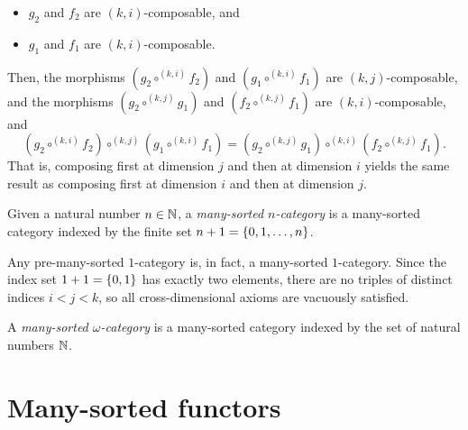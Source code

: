\begin{definition}
\begin{enumerate}
\begin{itemize}
        \item $g_2$ and $f_2$ are $(k,i)$-composable, and
        \item $g_1$ and $f_1$ are $(k,i)$-composable.
      \end{itemize}
      Then, the morphisms $(g_2 \circ^{(k,i)} f_2)$ and $(g_1 \circ^{(k,i)} f_1)$ are
      $(k,j)$-composable, and the morphisms $(g_2 \circ^{(k,j)} g_1)$ and $(f_2 \circ^{(k,j)} f_1)$
      are $(k,i)$-composable, and
      \[
        (g_2 \circ^{(k,i)} f_2) \circ^{(k,j)} (g_1 \circ^{(k,i)} f_1) =
        (g_2 \circ^{(k,j)} g_1) \circ^{(k,i)} (f_2 \circ^{(k,j)} f_1).
      \]
      That is, composing first at dimension $j$ and then at dimension $i$ yields the same result as
      composing first at dimension $i$ and then at dimension $j$.
  \end{enumerate}

  \begin{definition}
    \label{def:ManySortedNCategory}
    \leanok
    Given a natural number $n \in \mathbb{N}$, a \emph{many-sorted $n$-category} is a many-sorted category
    indexed by the finite set $n + 1 = \left\{ 0, 1, \ldots, n \right\}$.
  \end{definition}

  \begin{definition}
    \label{def:PreManySortedCategoryLift}
    Any pre-many-sorted $1$-category is, in fact, a many-sorted $1$-category. Since the index
    set $1 + 1 = \left\{ 0, 1 \right\}$ has exactly two elements, there are no triples of distinct indices $i <
    j < k$, so all cross-dimensional axioms are vacuously satisfied.
  \end{definition}

  \begin{definition}
    \label{def:ManySortedOmegaCategory}
    \leanok
    A \emph{many-sorted $\omega$-category} is a many-sorted category indexed by the set of natural
    numbers $\mathbb{N}$.
  \end{definition}
\end{definition}

\section{Many-sorted functors}


